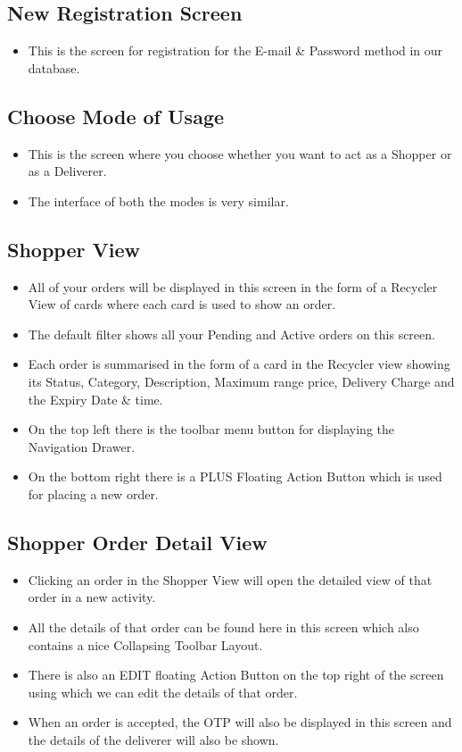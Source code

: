 \documentclass{report}
\begin{document}
\subsection{New Registration Screen}
\begin{itemize}
\item This is the screen for registration for the E-mail \& Password method in our database.
\end{itemize}

\subsection{Choose Mode of Usage}
\begin{itemize}
\item This is the screen where you choose whether you want to act as a Shopper or as a Deliverer.
\item The interface of both the modes is very similar.
\end{itemize}

\subsection{Shopper View}
\begin{itemize}
\item All of your orders will be displayed in this screen in the form of a Recycler View of cards where each card is used to show an order.
\item The default filter shows all your Pending and Active orders on this screen.
\item Each order is summarised in the form of a card in the Recycler view showing its Status, Category, Description, Maximum range price, Delivery Charge and the Expiry Date \& time.
\item On the top left there is the toolbar menu button for displaying the Navigation Drawer.
\item On the bottom right there is a PLUS Floating Action Button which is used for placing a new order.
\end{itemize}

\subsection{Shopper Order Detail View}
\begin{itemize}
\item Clicking an order in the Shopper View will open the detailed view of that order in a new activity.
\item All the details of that order can be found here in this screen which also contains a nice Collapsing Toolbar Layout.
\item There is also an EDIT floating Action Button on the top right of the screen using which we can edit the details of that order.
\item When an order is accepted, the OTP will also be displayed in this screen and the details of the deliverer will also be shown.
\end{itemize}
\end{document}
